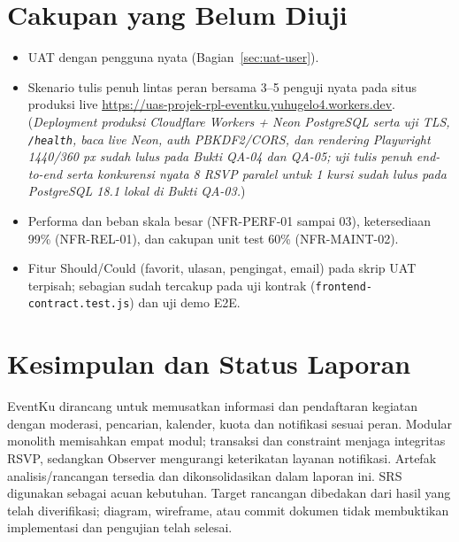 \documentclass[11pt,a4paper]{article}
\newcommand{\page}[1]{\clearpage\section{#1}}
\begin{document}
\section{Cakupan yang Belum Diuji}
\begin{itemize}
\item UAT dengan pengguna nyata (Bagian~\ref{sec:uat-user}).
\item Skenario tulis penuh lintas peran bersama 3--5 penguji nyata pada situs produksi live \url{https://uas-projek-rpl-eventku.yuhugelo4.workers.dev}. (\emph{Deployment produksi Cloudflare Workers + Neon PostgreSQL serta uji TLS, \texttt{/health}, baca live Neon, auth PBKDF2/CORS, dan rendering Playwright 1440/360 px sudah lulus pada Bukti QA-04 dan QA-05; uji tulis penuh end-to-end serta konkurensi nyata 8 RSVP paralel untuk 1 kursi sudah lulus pada PostgreSQL 18.1 lokal di Bukti QA-03.})
\item Performa dan beban skala besar (NFR-PERF-01 sampai 03), ketersediaan 99\% (NFR-REL-01), dan cakupan unit test 60\% (NFR-MAINT-02).
\item Fitur Should/Could (favorit, ulasan, pengingat, email) pada skrip UAT terpisah; sebagian sudah tercakup pada uji kontrak (\texttt{frontend-contract.test.js}) dan uji demo E2E.
\end{itemize}
\page{Kesimpulan dan Status Laporan}
EventKu dirancang untuk memusatkan informasi dan pendaftaran kegiatan dengan moderasi, pencarian, kalender, kuota dan notifikasi sesuai peran. Modular monolith memisahkan empat modul; transaksi dan constraint menjaga integritas RSVP, sedangkan Observer mengurangi keterikatan layanan notifikasi.
Artefak analisis/rancangan tersedia dan dikonsolidasikan dalam laporan ini. SRS digunakan sebagai acuan kebutuhan. Target rancangan dibedakan dari hasil yang telah diverifikasi; diagram, wireframe, atau commit dokumen tidak membuktikan implementasi dan pengujian telah selesai.
\end{document}
